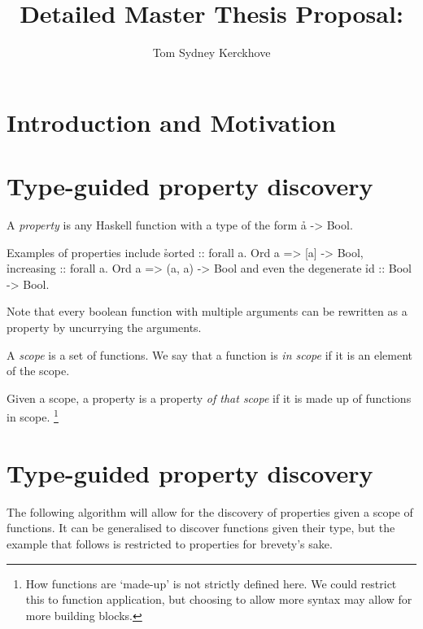 \documentclass[a4paper, 11pt]{article}
\title{Detailed Master Thesis Proposal:\\\vspace{0.5cm}{\Huge Functional Property Discovery and Corresponding Test Generation in Haskell}}
\author{Tom Sydney Kerckhove}
\begin{document}
\maketitle

\section{Introduction and Motivation}

\newpage

\section{Type-guided property discovery}

\begin{de}
  A \emph{property} is any Haskell function with a type of the form \h{a -> Bool}.
\end{de}

\begin{ex}
  Examples of properties include \h{sorted :: forall a. Ord a => [a] -> Bool}, \h{increasing :: forall a. Ord a => (a, a) -> Bool} and even the degenerate \h{id :: Bool -> Bool}.

  Note that every boolean function with multiple arguments can be rewritten as a property by uncurrying the arguments.
\end{ex}

\begin{de}
  A \emph{scope} is a set of functions.
  We say that a function is \emph{in scope} if it is an element of the scope.
\end{de}

\begin{de}
  Given a scope, a property is a property \emph{of that scope} if it is made up of functions in scope.
  \footnote{How functions are `made-up' is not strictly defined here. We could restrict this to function application, but choosing to allow more syntax may allow for more building blocks.}
\end{de}

\section{Type-guided property discovery}

The following algorithm will allow for the discovery of properties given a scope of functions.
It can be generalised to discover functions given their type, but the example that follows is restricted to properties for brevety's sake.
\end{document}

